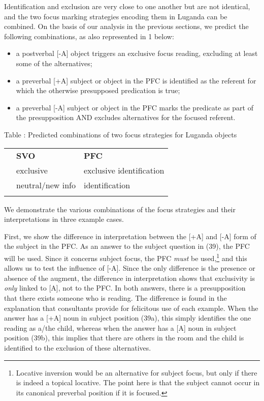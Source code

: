 \documentclass[output=paper]{langsci/langscibook}
\begin{document}
Identification and exclusion are very close to one another but are not identical, and the two focus marking strategies encoding them in Luganda can be combined. On the basis of our analysis in the previous sections, we predict the following combinations, as also represented in 1 below:

\begin{itemize}
 \item a postverbal [-A] object triggers an exclusive focus reading, excluding at least some of the alternatives;
 \item a preverbal [+A] subject or object in the PFC is identified as the referent for which the otherwise presupposed predication is true;
 \item a preverbal [-A] subject or object in the PFC marks the predicate as part of the presupposition AND excludes alternatives for the focused referent.
\end{itemize} 

\begin{table}
 Table : Predicted combinations of two focus strategies for Luganda objects

\begin{tabularx}{\textwidth}{XXX} & {\mdseries \textbf{SVO}} & {\mdseries \textbf{PFC}}\\
\lsptoprule
{\mdseries [-A]} & {\mdseries exclusive} & {\mdseries exclusive identification}\\
{\mdseries [+A]} & {\mdseries neutral/new info} & {\mdseries identification}\\
\lspbottomrule
\end{tabularx}
\end{table}

We demonstrate the various combinations of the focus strategies and their interpretations in three example cases.

  First, we show the difference in interpretation between the [+A] and [-A] form of the subject in the PFC. As an answer to the subject question in (39), the PFC will be used. Since it concerns subject focus, the PFC \textit{must} be used,\footnote{Locative inversion would be an alternative for subject focus, but only if there is indeed a topical locative. The point here is that the subject cannot occur in its canonical preverbal position if it is focused.} and this allows us to test the influence of [-A]. Since the only difference is the presence or absence of the augment, the difference in interpretation shows that exclusivity is \textit{only} linked to [A], not to the PFC. In both answers, there is a presupposition that there exists someone who is reading. The difference is found in the explanation that consultants provide for felicitous use of each example. When the answer has a [+A] noun in subject position (39a), this simply identifies the one reading as a/the child, whereas when the answer has a [A] noun in subject position (39b), this implies that there are others in the room and the child is identified to the exclusion of these alternatives.
\end{document}
